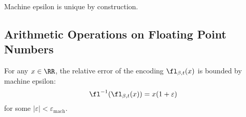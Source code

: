\begin{rmk}
Machine epsilon is unique by construction.
\end{rmk}

\subsection{Arithmetic Operations on Floating Point Numbers}

\begin{prop}
For any $x\in\RR$, the relative error of the encoding $\fl_{\beta,t}(x)$
is bounded by machine epsilon:
\begin{equation}
  \fl^{-1}(\fl_{\beta,t}(x)) = x(1 + \varepsilon)
\end{equation}
for some $|\varepsilon|<\varepsilon_{\text{mach}}$.
\end{prop}

